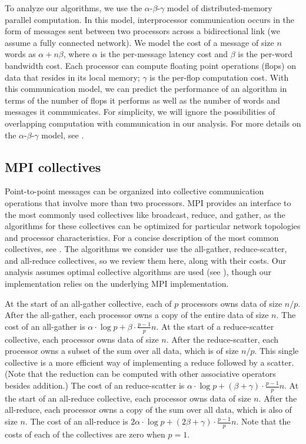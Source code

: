 To analyze our algorithms, we use the $\alpha$-$\beta$-$\gamma$ model of distributed-memory parallel computation.
In this model, interprocessor communication occurs in the form of messages sent between two processors across a bidirectional link (we assume a fully connected network).
We model the cost of a message of size $n$ words as $\alpha+n\beta$, where $\alpha$ is the per-message latency cost and $\beta$ is the per-word bandwidth cost.
Each processor can compute floating point operations (flops) on data that resides in its local memory; $\gamma$ is the per-flop computation cost.
With this communication model, we can predict the performance of an algorithm in terms of the number of flops it performs as well as the number of words and messages it communicates.
For simplicity, we will ignore the possibilities of overlapping computation with communication in our analysis.
For more details on the $\alpha$-$\beta$-$\gamma$ model, see \cite{TRG05,CH+07}.

\subsection{MPI collectives}
\label{sec:collectives}

Point-to-point messages can be organized into collective communication operations that involve more than two processors.
MPI provides an interface to the most commonly used collectives like broadcast, reduce, and gather, as the algorithms for these collectives can be optimized for particular network topologies and processor characteristics.
For a concise description of the most common collectives, see \cite[Figure 1]{CH+07}.
The algorithms we consider use the all-gather, reduce-scatter, and all-reduce collectives, so we review them here, along with their costs.
Our analysis assumes optimal collective algorithms are used (see \cite{TRG05,CH+07}), though our implementation relies on the underlying MPI implementation.

At the start of an all-gather collective, each of $p$ processors owns data of size $n/p$. 
After the all-gather, each processor owns a copy of the entire data of size $n$. 
The cost of an all-gather is $\alpha\cdot \log p + \beta \cdot \frac{p-1}{p}n$.
%
At the start of a reduce-scatter collective, each processor owns data of size $n$.
After the reduce-scatter, each processor owns a subset of the sum over all data, which is of size $n/p$.
This single collective is a more efficient way of implementing a reduce followed by a scatter.
(Note that the reduction can be computed with other associative operators besides addition.)
The cost of an reduce-scatter is $\alpha\cdot \log p + (\beta+\gamma) \cdot \frac{p-1}{p}n$.
%
At the start of an all-reduce collective, each processor owns data of size $n$.
After the all-reduce, each processor owns a copy of the sum over all data, which is also of size $n$.
The cost of an all-reduce is $2\alpha\cdot \log p + (2\beta+\gamma) \cdot \frac{p-1}{p}n$.
%
Note that the costs of each of the collectives are zero when $p=1$.

